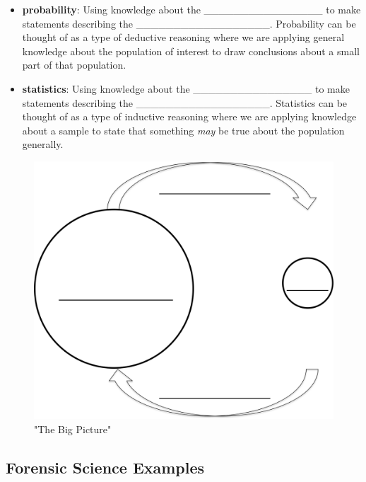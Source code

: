 \documentclass[]{book}
\providecommand{\tightlist}{%
  \setlength{\itemsep}{0pt}\setlength{\parskip}{0pt}}
\theoremstyle{definition}
\theoremstyle{definition}
\theoremstyle{remark}
\begin{document}
\vspace{.1in}

\begin{itemize}
\tightlist
\item
  \textbf{probability}: Using knowledge about the
  \_\_\_\_\_\_\_\_\_\_\_\_\_\_\_\_ to make statements describing the
  \_\_\_\_\_\_\_\_\_\_\_\_\_\_\_\_\_\_. Probability can be thought of as
  a type of deductive reasoning where we are applying general knowledge
  about the population of interest to draw conclusions about a small
  part of that population.
\end{itemize}

\vspace{.1in}

\begin{itemize}
\tightlist
\item
  \textbf{statistics}: Using knowledge about the
  \_\_\_\_\_\_\_\_\_\_\_\_\_\_\_\_ to make statements describing the
  \_\_\_\_\_\_\_\_\_\_\_\_\_\_\_\_\_\_. Statistics can be thought of as
  a type of inductive reasoning where we are applying knowledge about a
  sample to state that something \emph{may} be true about the population
  generally.
\end{itemize}

\begin{figure}[h]

{\centering \includegraphics[width=.5\linewidth]{img/thebigpic} 

}

\caption{"The Big Picture"}\label{fig:thebigpic}
\end{figure}

\subsection{Forensic Science Examples}\label{forensic-science-examples}
\end{document}
